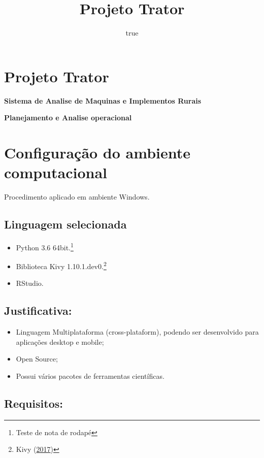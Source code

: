 \documentclass[12pt,]{article}
\title{Projeto Trator}
\author{true}
\date{}
\providecommand{\tightlist}{%
  \setlength{\itemsep}{0pt}\setlength{\parskip}{0pt}}
\let\rmarkdownfootnote\footnote%
\def\footnote{\protect\rmarkdownfootnote}
\begin{document}
\maketitle

\section{Projeto Trator}\label{projeto-trator}

\textbf{Sistema de Analise de Maquinas e Implementos Rurais}

\textbf{Planejamento e Analise operacional}

\section{Configuração do ambiente
computacional}\label{configuracao-do-ambiente-computacional}

Procedimento aplicado em ambiente Windows.

\subsection{Linguagem selecionada}\label{linguagem-selecionada}

\begin{itemize}
\tightlist
\item
  Python 3.6 64bit.\footnote{Teste de nota de rodapé}
\item
  Biblioteca Kivy 1.10.1.dev0.\footnote{Kivy
    (\protect\hyperlink{ref-kivy2}{2017})}
\item
  RStudio.
\end{itemize}

\subsection{Justificativa:}\label{justificativa}

\begin{itemize}
\tightlist
\item
  Linguagem Multiplataforma (cross-plataform), podendo ser desenvolvido
  para aplicações desktop e mobile;
\item
  Open Source;
\item
  Possui vários pacotes de ferramentas científicas.
\end{itemize}

\subsection{Requisitos:}\label{requisitos}
\end{document}
